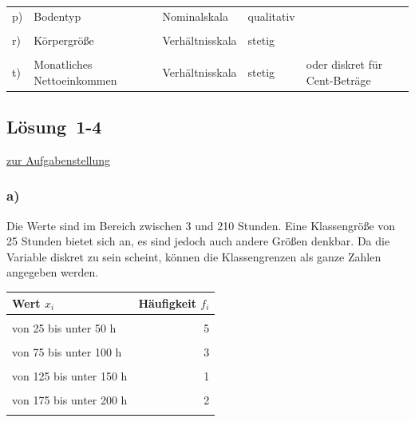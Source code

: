 \documentclass[
  11pt,
  ngerman,
  a4paper,
]{report}
\begin{document}
\begin{table}[H]
\begin{tabular}{l>{\raggedright\arraybackslash}p{8cm}>{\raggedright\arraybackslash}p{8cm}l>{\raggedright\arraybackslash}p{8cm}}
p) & Bodentyp & Nominalskala & qualitativ & \\
\cellcolor{gray!6}{q)} & \cellcolor{gray!6}{Entfernung zum Stadtzentrum in km} & \cellcolor{gray!6}{Verhältnisskala} & \cellcolor{gray!6}{stetig} & \cellcolor{gray!6}{}\\
r) & Körpergröße & Verhältnisskala & stetig & \\
\cellcolor{gray!6}{s)} & \cellcolor{gray!6}{Kleidergröße (S bis XXL)} & \cellcolor{gray!6}{Ordinalskala} & \cellcolor{gray!6}{qualitativ} & \cellcolor{gray!6}{}\\
t) & Monatliches Nettoeinkommen & Verhältnisskala & stetig & oder diskret für Cent-Beträge\\
\bottomrule
\end{tabular}
\end{table}

\hypertarget{loesung-1-4}{%
\subsection{Lösung~1-4}\label{loesung-1-4}}

\protect\hyperlink{aufgabe-1-4}{zur Aufgabenstellung}

\hypertarget{a-1}{%
\subsubsection{a)}\label{a-1}}

Die Werte sind im Bereich zwischen 3 und 210 Stunden. Eine Klassengröße von 25 Stunden bietet sich an, es sind jedoch auch andere Größen denkbar. Da die Variable diskret zu sein scheint, können die Klassengrenzen als ganze Zahlen angegeben werden.

\begin{table}[H]
\centering
\begin{tabular}{lr}
\toprule
\textbf{Wert $x_i$} & \textbf{Häufigkeit $f_i$}\\
\midrule
\cellcolor{gray!6}{von 0 bis unter 25 h} & \cellcolor{gray!6}{9}\\
von 25 bis unter 50 h & 5\\
\cellcolor{gray!6}{von 50 bis unter 75 h} & \cellcolor{gray!6}{2}\\
von 75 bis unter 100 h & 3\\
\cellcolor{gray!6}{von 100 bis unter 125 h} & \cellcolor{gray!6}{1}\\
von 125 bis unter 150 h & 1\\
\cellcolor{gray!6}{von 150 bis unter 175 h} & \cellcolor{gray!6}{0}\\
von 175 bis unter 200 h & 2\\
\cellcolor{gray!6}{von 200 bis unter 225 h} & \cellcolor{gray!6}{1}\\
\bottomrule
\end{tabular}
\end{table}
\end{document}
